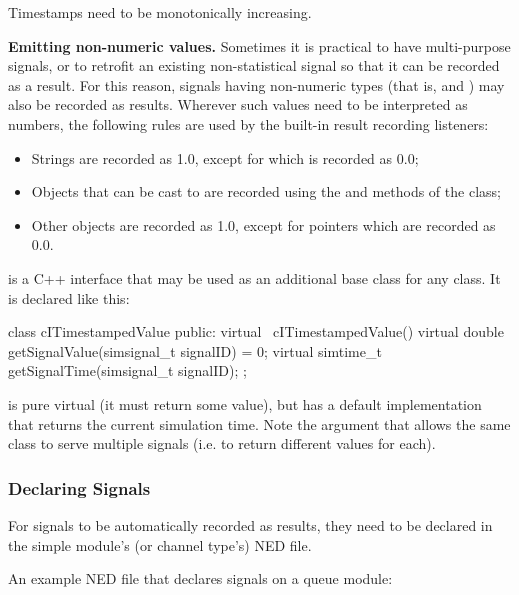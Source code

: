 Timestamps need to be monotonically increasing.

\textbf{Emitting non-numeric values.} Sometimes it is practical to have
multi-purpose signals, or to retrofit an existing non-statistical signal so
that it can be recorded as a result. For this reason, signals having
non-numeric types (that is,  and ) may
also be recorded as results. Wherever such values need to be interpreted as
numbers, the following rules are used by the built-in result recording
listeners:

\begin{itemize}
  \item Strings are recorded as 1.0, except for  which is recorded as 0.0;
  \item Objects that can be cast to  are recorded
     using the  and 
     methods of the class;
  \item Other objects are recorded as 1.0, except for  pointers which
     are recorded as 0.0.
\end{itemize}

 is a C++ interface that may be used as an additional
base class for any class. It is declared like this:

\begin{cpp}
class cITimestampedValue {
    public:
        virtual ~cITimestampedValue() {}
        virtual double getSignalValue(simsignal_t signalID) = 0;
        virtual simtime_t getSignalTime(simsignal_t signalID);
};
\end{cpp}

 is pure virtual (it must return some value),
but  has a default implementation that
returns the current simulation time. Note the  argument
that allows the same class to serve multiple signals (i.e. to return
different values for each).


\subsubsection{Declaring Signals}
\label{sec:ch-simple-modules:statistic-signal-decl}

For signals to be automatically recorded as results, they need to be
declared in the simple module's (or channel type's) NED file.

An example NED file that declares signals on a queue module:

